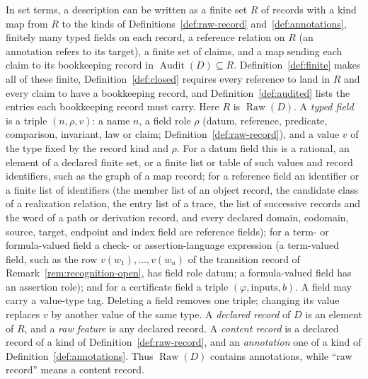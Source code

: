 \documentclass[11pt]{article}
\theoremstyle{definition}
\newcommand{\Raw}[1]{\ensuremath{\operatorname{Raw}\!\left(#1\right)}}
\newcommand{\Audit}[1]{\ensuremath{\operatorname{Audit}\!\left(#1\right)}}
\begin{document}
In set terms, a description can be written as a finite set \(R\) of records
with a kind map from \(R\) to the kinds of Definitions~\ref{def:raw-record}
and~\ref{def:annotations}, finitely many typed fields on each record, a
reference relation on \(R\) (an annotation refers to its target), a finite
set of claims, and a map sending each claim to its bookkeeping record in
\(\Audit{D}\subseteq R\). Definition~\ref{def:finite} makes all of these
finite, Definition~\ref{def:closed} requires every reference to land in
\(R\) and every claim to have a bookkeeping record, and
Definition~\ref{def:audited} lists the entries each bookkeeping record must
carry. Here \(R\) is \(\Raw{D}\). A \emph{typed field} is a triple \((n,\rho,v)\): a
name \(n\), a field role \(\rho\) (datum, reference, predicate, comparison,
invariant, law or claim; Definition~\ref{def:raw-record}), and a value \(v\) of
the type fixed by the record kind and \(\rho\). For a datum field this is a
rational, an element of a declared finite set, or a finite list or table of
such values and record identifiers, such as the graph of a map record; for a
reference field an identifier or a finite list of identifiers (the member
list of an object record, the candidate class of a realization relation, the
entry list of a trace, the list of successive records and the word of a path
or derivation record, and
every declared domain, codomain, source, target, endpoint and index field are
reference fields); for a term- or
formula-valued field a check- or assertion-language expression (a term-valued field, such as the row
\(v(w_1),\dots,v(w_n)\) of the transition record of Remark~\ref{rem:recognition-open}, has
field role datum; a formula-valued field has an assertion role); and for a
certificate field a triple \((\varphi,\text{inputs},b)\). A field may carry a
value-type tag. Deleting a field removes one triple; changing its value
replaces \(v\) by another value of the same type. A \emph{declared record} of \(D\) is an
element of \(R\), and a \emph{raw feature} is any declared record. A
\emph{content record} is a declared record of a kind of
Definition~\ref{def:raw-record}, and an \emph{annotation} one of a kind of
Definition~\ref{def:annotations}. Thus \(\Raw{D}\) contains annotations, while
``raw record'' means a content record.
\end{document}
